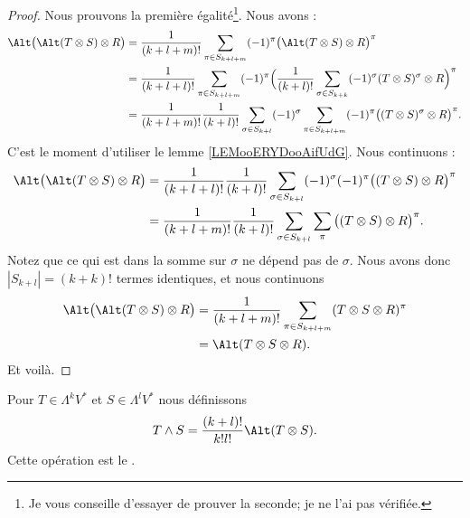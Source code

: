\begin{proof}
	Nous prouvons la première égalité\footnote{Je vous conseille d'essayer de prouver la seconde; je ne l'ai pas vérifiée.}. Nous avons :
	\begin{subequations}
		\begin{align}
			\Alt\big( \Alt(T\otimes S)\otimes R \big) & =\frac{1}{ (k+l+m)!}\sum_{\pi\in S_{k+l+m}}(-1)^{\pi}\big( \Alt(T\otimes S)\otimes R \big)^{\pi}                                                             \\
			                                          & =\frac{1}{ (k+l+l)!}\sum_{\pi\in S_{k+l+m}}(-1)^{\pi}\Big( \frac{1}{ (k+l)!}\sum_{\sigma\in S_{k+k}}(-1)^{\sigma}(T\otimes S)^{\sigma}\otimes R \Big)^{\pi}  \\
			                                          & =\frac{1}{ (k+l+m)!}\frac{1}{ (k+l)!}\sum_{\sigma\in S_{k+l}}(-1)^{\sigma}\sum_{\pi\in S_{k+l+m}}(-1)^{\pi}\big( (T\otimes S)^{\sigma}\otimes R \big)^{\pi}.
		\end{align}
	\end{subequations}
	C'est le moment d'utiliser le lemme \ref{LEMooERYDooAifUdG}. Nous continuons :
	\begin{subequations}
		\begin{align}
			\Alt\big( \Alt(T\otimes S)\otimes R \big) & = \frac{1}{ (k+l+l)!}\frac{1}{ (k+l)!}\sum_{\sigma\in S_{k+l}}(-1)^{\sigma}(-1)^{\pi}\big( (T\otimes S)\otimes R \big)^{\pi} \\
			                                          & =\frac{1}{ (k+l+m)!}\frac{1}{ (k+l)!}\sum_{\sigma\in S_{k+l}}\sum_{\pi}\big( (T\otimes S)\otimes R \big)^{\pi}.
		\end{align}
	\end{subequations}
	Notez que ce qui est dans la somme sur \( \sigma\) ne dépend pas de \( \sigma\). Nous avons donc \( | S_{k+l} |=(k+k)!\) termes identiques, et nous continuons
	\begin{subequations}
		\begin{align}
			\Alt\big( \Alt(T\otimes S)\otimes R \big) & = \frac{1}{ (k+l+m)!}\sum_{\pi\in S_{k+l+m}}(T\otimes S\otimes R)^{\pi} \\
			                                          & =\Alt(T\otimes S\otimes R).
		\end{align}
	\end{subequations}
	Et voilà.
\end{proof}

\begin{definition}
	Pour \( T\in \Lambda^kV^*\) et \( S\in\Lambda^lV^*\) nous définissons
	\begin{equation}
		T\wedge S=\frac{ (k+l)! }{ k!l! }\Alt(T\otimes S).
	\end{equation}
	Cette opération est le .
\end{definition}

